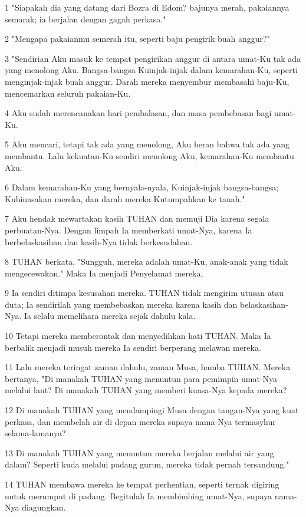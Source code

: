\par 1 "Siapakah dia yang datang dari Bozra di Edom? bajunya merah, pakaiannya semarak; ia berjalan dengan gagah perkasa."
\par 2 "Mengapa pakaianmu semerah itu, seperti baju pengirik buah anggur?"
\par 3 "Sendirian Aku masuk ke tempat pengirikan anggur di antara umat-Ku tak ada yang menolong Aku. Bangsa-bangsa Kuinjak-injak dalam kemarahan-Ku, seperti menginjak-injak buah anggur. Darah mereka menyembur membasahi baju-Ku, mencemarkan seluruh pakaian-Ku.
\par 4 Aku sudah merencanakan hari pembalasan, dan masa pembebasan bagi umat-Ku.
\par 5 Aku mencari, tetapi tak ada yang menolong, Aku heran bahwa tak ada yang membantu. Lalu kekuatan-Ku sendiri menolong Aku, kemarahan-Ku membantu Aku.
\par 6 Dalam kemarahan-Ku yang bernyala-nyala, Kuinjak-injak bangsa-bangsa; Kubinasakan mereka, dan darah mereka Kutumpahkan ke tanah."
\par 7 Aku hendak mewartakan kasih TUHAN dan memuji Dia karena segala perbuatan-Nya. Dengan limpah Ia memberkati umat-Nya, karena Ia berbelaskasihan dan kasih-Nya tidak berkesudahan.
\par 8 TUHAN berkata, "Sungguh, mereka adalah umat-Ku, anak-anak yang tidak mengecewakan." Maka Ia menjadi Penyelamat mereka,
\par 9 Ia sendiri ditimpa kesusahan mereka. TUHAN tidak mengirim utusan atau duta; Ia sendirilah yang membebaskan mereka karena kasih dan belaskasihan-Nya. Ia selalu memelihara mereka sejak dahulu kala.
\par 10 Tetapi mereka memberontak dan menyedihkan hati TUHAN. Maka Ia berbalik menjadi musuh mereka Ia sendiri berperang melawan mereka.
\par 11 Lalu mereka teringat zaman dahulu, zaman Musa, hamba TUHAN. Mereka bertanya, "Di manakah TUHAN yang menuntun para pemimpin umat-Nya melalui laut? Di manakah TUHAN yang memberi kuasa-Nya kepada mereka?
\par 12 Di manakah TUHAN yang mendampingi Musa dengan tangan-Nya yang kuat perkasa, dan membelah air di depan mereka supaya nama-Nya termasyhur selama-lamanya?
\par 13 Di manakah TUHAN yang menuntun mereka berjalan melalui air yang dalam? Seperti kuda melalui padang gurun, mereka tidak pernah tersandung."
\par 14 TUHAN membawa mereka ke tempat perhentian, seperti ternak digiring untuk merumput di padang. Begitulah Ia membimbing umat-Nya, supaya nama-Nya diagungkan.
